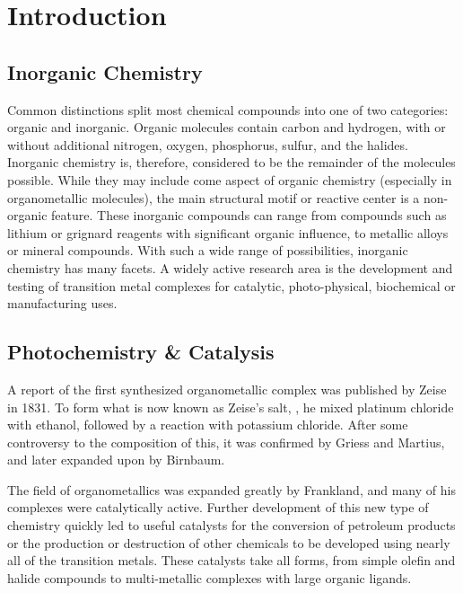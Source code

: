 \chapter{Introduction}
\section{Inorganic Chemistry}

Common distinctions split most chemical compounds into one of two categories: organic and inorganic. Organic molecules contain carbon and hydrogen, with or without additional nitrogen, oxygen, phosphorus, sulfur, and the halides. Inorganic chemistry is, therefore, considered to be the remainder of the molecules possible. While they may include come aspect of organic chemistry (especially in organometallic molecules), the main structural motif or reactive center is a non-organic feature. These inorganic compounds can range from compounds such as lithium or grignard reagents with significant organic influence, to metallic alloys or mineral compounds. With such a wide range of possibilities, inorganic chemistry has many facets. A widely active research area is the development and testing of transition metal complexes for catalytic, photo-physical, biochemical or manufacturing uses.

\section{Photochemistry \& Catalysis}

A report of the first synthesized organometallic complex was published by Zeise in 1831\autocite{zeise1831}. To form what is now known as Zeise's salt, , he mixed platinum chloride with ethanol, followed by a reaction with potassium chloride\autocite{hunt1984}. After some controversy to the composition of this, it was confirmed by Griess and Martius\autocite{griess1861}, and later expanded upon by Birnbaum\autocite{birnbaum1868}. 

The field of organometallics was expanded greatly by Frankland\autocite{hunt1984}, and many of his complexes were catalytically active. Further development of this new type of chemistry quickly led to useful catalysts for the conversion of petroleum products or the production or destruction of other chemicals to be developed using nearly all of the transition metals. These catalysts take all forms, from simple olefin and halide compounds to multi-metallic complexes with large organic ligands.


